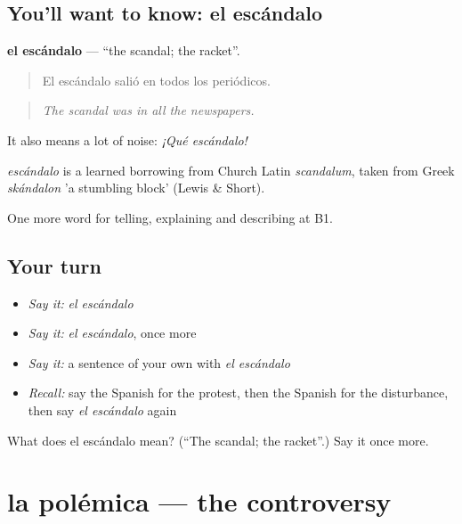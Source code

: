 \subsection*{You'll want to know: el escándalo}
\textbf{el escándalo} — \textquotedblleft{}the scandal; the racket\textquotedblright{}.

\begin{quote}
El escándalo salió en todos los periódicos.
\end{quote}

\begin{quote}
\emph{The scandal was in all the newspapers.}
\end{quote}

It also means a lot of noise: \emph{¡Qué escándalo!}

\begin{cousinweb}
\emph{escándalo} is a learned borrowing from Church Latin \emph{scandalum}, taken from Greek \emph{skándalon} 'a stumbling block' (Lewis \& Short).
\end{cousinweb}

\begin{grammarlens}[title={What you've built}]
One more word for telling, explaining and describing at B1.
\end{grammarlens}

\subsection*{Your turn}
\begin{itemize}
\raggedright
  \item \emph{Say it:} \emph{el escándalo}
  \item \emph{Say it:} \emph{el escándalo}, once more
  \item \emph{Say it:} a sentence of your own with \emph{el escándalo}
  \item \emph{Recall:} say the Spanish for the protest, then the Spanish for the disturbance, then say \emph{el escándalo} again
\end{itemize}

\begin{tcolorbox}[breakable,colback=teal!4,colframe=teal!35!black,title={Before you move on}]
What does el escándalo mean? (\textquotedblleft{}The scandal; the racket\textquotedblright{}.) Say it once more.
\end{tcolorbox}
\section[la polémica]{la polémica — the controversy}


